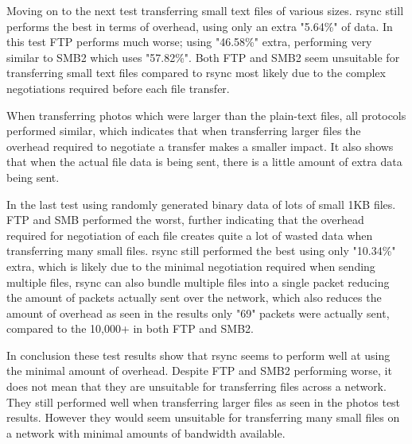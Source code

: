 Moving on to the next test transferring small text files of various sizes. rsync still performs the best in terms of overhead, using only an extra "5.64\%" of data. In this test FTP performs much worse; using "46.58\%" extra, performing very similar to SMB2 which uses "57.82\%". Both FTP and SMB2 seem unsuitable for transferring small text files compared to rsync most likely due to the complex negotiations required before each file transfer.

When transferring photos which were larger than the plain-text files, all protocols performed similar, which indicates that when transferring larger files the overhead required to negotiate a transfer makes a smaller impact. It also shows that when the actual file data is being sent, there is a little amount of extra data being sent.

In the last test using randomly generated binary data of lots of small 1KB files. FTP and SMB performed the worst, further indicating that the overhead required for negotiation of each file creates quite a lot of wasted data when transferring many small files. rsync still performed the best using only "10.34\%" extra, which is likely due to the minimal negotiation required when sending multiple files, rsync can also bundle multiple files into a single packet reducing the amount of packets actually sent over the network, which also reduces the amount of overhead as seen in the results only "69" packets were actually sent, compared to the 10,000+ in both FTP and SMB2.

In conclusion these test results show that rsync seems to perform well at using the minimal amount of overhead. Despite FTP and SMB2 performing worse, it does not mean that they are unsuitable for transferring files across a network. They still performed well when transferring larger files as seen in the photos test results. However they would seem unsuitable for transferring many small files on a network with minimal amounts of bandwidth available.
